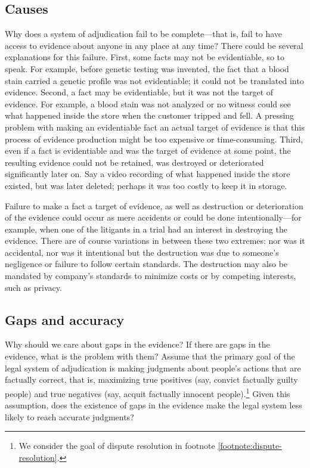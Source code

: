 \documentclass[
  10pt,
  dvipsnames,enabledeprecatedfontcommands]{scrartcl}
\begin{document}
\hypertarget{causes}{%
\subsection{Causes}\label{causes}}

Why does a system of adjudication fail to be complete---that is, fail to
have access to evidence about anyone in any place at any time? There
could be several explanations for this failure. First, some facts may
not be evidentiable, so to speak. For example, before genetic testing
was invented, the fact that a blood stain carried a genetic profile was
not evidentiable; it could not be translated into evidence. Second, a
fact may be evidentiable, but it was not the target of evidence. For
example, a blood stain was not analyzed or no witness could see what
happened inside the store when the customer tripped and fell. A pressing
problem with making an evidentiable fact an actual target of evidence is
that this process of evidence production might be too expensive or
time-consuming. Third, even if a fact is evidentiable and was the target
of evidence at some point, the resulting evidence could not be retained,
was destroyed or deteriorated significantly later on. Say a video
recording of what happened inside the store existed, but was later
deleted; perhaps it was too costly to keep it in storage.

Failure to make a fact a target of evidence, as well as destruction or
deterioration of the evidence could occur as mere accidents or could be
done intentionally---for example, when one of the litigants in a trial
had an interest in destroying the evidence. There are of course
variations in between these two extremes: nor was it accidental, nor was
it intentional but the destruction was due to someone's negligence or
failure to follow certain standards. The destruction may also be
mandated by company's standards to minimize costs or by competing
interests, such as privacy.

\hypertarget{gaps-and-accuracy}{%
\subsection{Gaps and accuracy}\label{gaps-and-accuracy}}

Why should we care about gaps in the evidence? If there are gaps in the
evidence, what is the problem with them? Assume that the primary goal of
the legal system of adjudication is making judgments about people's
actions that are factually correct, that is, maximizing true positives
(say, convict factually guilty people) and true negatives (say, acquit
factually innocent people).\footnote{We consider the goal of dispute
  resolution in footnote \ref{footnote:dispute-resolution}.} Given this
assumption, does the existence of gaps in the evidence make the legal
system less likely to reach accurate judgments?
\end{document}
